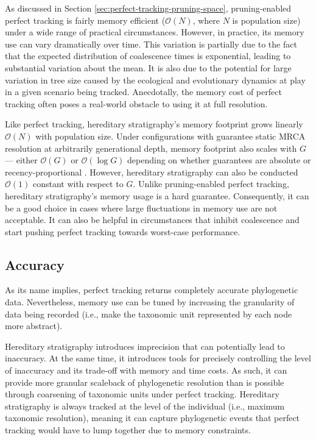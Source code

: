 As discussed in Section \ref{sec:perfect-tracking-pruning-space}, pruning-enabled perfect tracking is fairly memory efficient ($\mathcal{O}(N)$, where $N$ is population size) under a wide range of practical circumstances.
However, in practice, its memory use can vary dramatically over time.
This variation is partially due to the fact that the expected distribution of coalescence times is exponential, leading to substantial variation about the mean.
It is also due to the potential for large variation in tree size caused by the ecological and evolutionary dynamics at play in a given scenario being tracked.
Anecdotally, the memory cost of perfect tracking often poses a real-world obstacle to using it at full resolution.

Like perfect tracking, hereditary stratigraphy's memory footprint grows linearly $\mathcal{O}(N)$ with population size.
Under configurations with guarantee static MRCA resolution at arbitrarily generational depth, memory footprint also scales with $G$ --- either $\mathcal{O}(G)$ or $\mathcal{O}(\log G)$ depending on whether guarantees are absolute or recency-proportional \citep{moreno2024algorithms}.
However, hereditary stratigraphy can also be conducted $\mathcal{O}(1)$ constant with respect to $G$.
Unlike pruning-enabled perfect tracking, hereditary stratigraphy's memory usage is a hard guarantee.
Consequently, it can be a good choice in cases where large fluctuations in memory use are not acceptable.
It can also be helpful in circumstances that inhibit coalescence and start pushing perfect tracking towards worst-case performance.

\subsection{Accuracy}

As its name implies, perfect tracking returns completely accurate phylogenetic data.
Nevertheless, memory use can be tuned by increasing the granularity of data being recorded (i.e., make the taxonomic unit represented by each node more abstract).

Hereditary stratigraphy introduces imprecision that can potentially lead to inaccuracy.
At the same time, it introduces tools for precisely controlling the level of inaccuracy and its trade-off with memory and time costs.
As such, it can provide more granular scaleback of phylogenetic resolution than is possible through coarsening of taxonomic units under perfect tracking.
Hereditary stratigraphy is always tracked at the level of the individual (i.e., maximum taxonomic resolution), meaning it can capture phylogenetic events that perfect tracking would have to lump together due to memory constraints.

